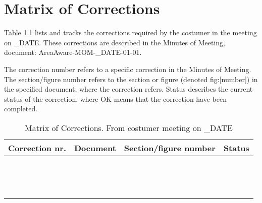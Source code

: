 \chapter{Matrix of Corrections}
\label{chp:matrix}

Table \ref{tb:MoC} lists and tracks the corrections required by the costumer in the meeting on _DATE. These corrections are described in the Minutes of Meeting, document: AreaAware-MOM-_DATE-01-01.

The correction number refers to a specific correction in the Minutes of Meeting. The section/figure number refers to the section or figure (denoted fig:[number]) in the specified document, where the correction refers. Status describes the current status of the correction, where OK means that the correction have been completed.\\

\begin{table}[ht]
\centering
\begin{tabular}{|c|c|>{\centering\arraybackslash}p{3cm}|>{\centering\arraybackslash}p{4cm}|}
\hline \textbf{Correction nr.} & \textbf{Document} & \textbf{Section/figure number} & \textbf{Status} \\ 
\hline  &  &  & \\ 
\hline  &  &  & \\ 
\hline  &  &  & \\ 
\hline  &  &  & \\ 
\hline  &  &  & \\ 
\hline  &  &  & \\ 
\hline  &  &  & \\ 
\hline  &  &  & \\ 
\hline  &  &  & \\ 
\hline  &  &  & \\ 
\hline  &  &  & \\ 
\hline  &  &  & \\ 
\hline  &  &  & \\ 
\hline  &  &  & \\ 
\hline 
\end{tabular}
\caption{Matrix of Corrections. From costumer meeting on _DATE}
\label{tb:MoC} 
\end{table}
